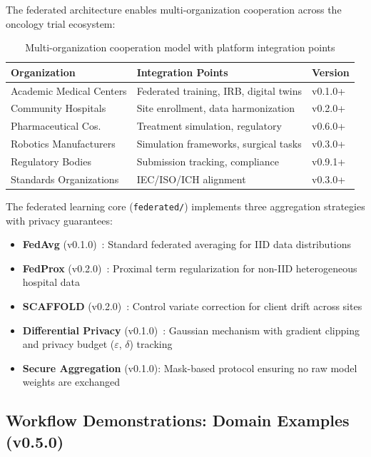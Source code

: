 The federated architecture enables multi-organization cooperation across the oncology trial ecosystem:

\begin{table}[H]
\centering
\caption{Multi-organization cooperation model with platform integration points}
\label{tab:cooperation}
\small
\begin{tabular}{@{}p{3.2cm}p{3.8cm}l@{}}
\toprule
\textbf{Organization} & \textbf{Integration Points} & \textbf{Version} \\
\midrule
Academic Medical Centers & Federated training, IRB, digital twins & v0.1.0+ \\
Community Hospitals & Site enrollment, data harmonization & v0.2.0+ \\
Pharmaceutical Cos. & Treatment simulation, regulatory & v0.6.0+ \\
Robotics Manufacturers & Simulation frameworks, surgical tasks & v0.3.0+ \\
Regulatory Bodies & Submission tracking, compliance & v0.9.1+ \\
Standards Organizations & IEC/ISO/ICH alignment & v0.3.0+ \\
\bottomrule
\end{tabular}
\end{table}

The federated learning core (\texttt{federated/}) implements three aggregation strategies with privacy guarantees:
\begin{itemize}
  \item \textbf{FedAvg} (v0.1.0)~\cite{mcmahan2017fedavg}: Standard federated averaging for IID data distributions
  \item \textbf{FedProx} (v0.2.0)~\cite{li2020fedprox}: Proximal term regularization for non-IID heterogeneous hospital data
  \item \textbf{SCAFFOLD} (v0.2.0)~\cite{karimireddy2020scaffold}: Control variate correction for client drift across sites
  \item \textbf{Differential Privacy} (v0.1.0)~\cite{dwork2014dp}: Gaussian mechanism with gradient clipping and privacy budget ($\varepsilon$, $\delta$) tracking
  \item \textbf{Secure Aggregation} (v0.1.0): Mask-based protocol ensuring no raw model weights are exchanged
\end{itemize}

\subsection{Workflow Demonstrations: Domain Examples (v0.5.0)}
\label{sec:examples}

